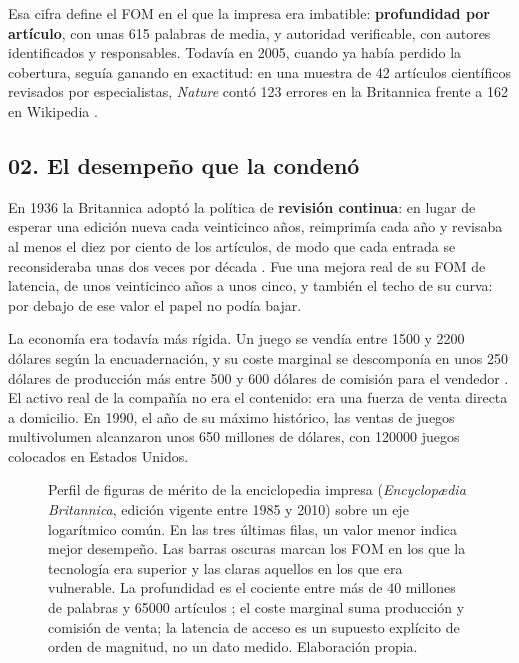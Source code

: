 \documentclass[11pt,letterpaper]{article}
\newcommand{\fomgrid}[1]{%
  \foreach \e in {-3,-2,...,9} {%
    \pgfmathsetmacro{\xg}{0.92*(\e+3)}%
    \draw[gray!16] (\xg,-0.45) -- (\xg,#1);%
  }%
  \foreach \e/\lab in {-3/{$10^{-3}$}, -1/{$10^{-1}$}, 1/{$10^{1}$},
                       3/{$10^{3}$}, 5/{$10^{5}$}, 7/{$10^{7}$}, 9/{$10^{9}$}} {%
    \pgfmathsetmacro{\xg}{0.92*(\e+3)}%
    \draw[gray!45] (\xg,-0.45) -- (\xg,#1);%
    \node[below, font=\tiny, gray!55!black] at (\xg,-0.45) {\lab};%
  }%
}
\newcommand{\fombar}[5]{%
  \node[left, text width=3.5cm, align=right, font=\scriptsize] at (-0.12,#1) {#4};%
  \fill[#3] (0,#1-0.17) rectangle (#2,#1+0.17);%
  \node[right, font=\scriptsize] at (#2+0.10,#1) {#5};%
}
\newcommand{\rCob}{Cobertura\\\tiny (artículos)}
\newcommand{\rPro}{Profundidad\\\tiny (palabras por artículo)}
\newcommand{\rLat}{Latencia de actualización\\\tiny (segundos)}
\newcommand{\rAcc}{Latencia de acceso\\\tiny (segundos)}
\newcommand{\rCos}[1]{Coste marginal\\por #1\\\tiny (dólares)}
\newcommand{\notafom}{En las tres últimas filas, un valor menor indica mejor
  desempeño.}
\begin{document}
Esa cifra define el FOM en el que la impresa era imbatible: \textbf{profundidad
por artículo}, con unas 615 palabras de media, y autoridad verificable, con
autores identificados y responsables. Todavía en 2005, cuando ya había perdido
la cobertura, seguía ganando en exactitud: en una muestra de 42 artículos
científicos revisados por especialistas, \emph{Nature} contó 123 errores en la
Britannica frente a 162 en Wikipedia \parencite{giles2005}.

\subsection*{02. El desempeño que la condenó}

En 1936 la Britannica adoptó la política de \textbf{revisión continua}: en lugar
de esperar una edición nueva cada veinticinco años, reimprimía cada año y
revisaba al menos el diez por ciento de los artículos, de modo que cada entrada
se reconsideraba unas dos veces por década \parencite{ebwiki}. Fue una mejora
real de su FOM de latencia, de unos veinticinco años a unos cinco, y también el techo de su curva:
por debajo de ese valor el papel no podía bajar.

La economía era todavía más rígida. Un juego se vendía entre \num{1500} y
\num{2200} dólares según la encuadernación, y su coste marginal se
descomponía en unos 250 dólares de producción más entre 500 y 600 dólares de
comisión para el vendedor \parencite{evans1997}. El activo real de la compañía no
era el contenido: era una fuerza de venta directa a domicilio. En 1990, el año
de su máximo histórico, las ventas de juegos multivolumen alcanzaron unos
650 millones de dólares, con \num{120000} juegos colocados en Estados Unidos.

\begin{figure}[ht]
  \centering
  \caption{Perfil de figuras de mérito de la enciclopedia impresa
  (\emph{Encyclopædia Britannica}, edición vigente entre 1985 y 2010) sobre un
  eje logarítmico común. \notafom{} Las barras oscuras marcan los FOM en los que
  la tecnología era superior y las claras aquellos en los que era vulnerable. La
  profundidad es el cociente entre más de 40 millones de palabras y
  \num{65000} artículos \parencite{evans1997}; el coste marginal suma producción
  y comisión de venta; la latencia de acceso es un supuesto explícito de orden
  de magnitud, no un dato medido. Elaboración propia.}
  \label{fig:fomimpresa}
\end{figure}
\end{document}
